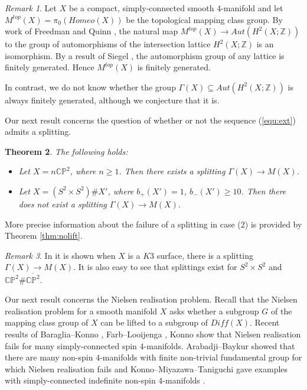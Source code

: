 \documentclass{amsart}
\newtheorem{theorem}{Theorem}[section]
\theoremstyle{definition}
\theoremstyle{remark}
\newtheorem{remark}[theorem]{Remark}
\numberwithin{equation}{section}
\begin{document}
\begin{remark}
Let $X$ be a compact, simply-connected smooth $4$-manifold and let $M^{top}(X) = \pi_0( Homeo(X) )$ be the topological mapping class group. By work of Freedman \cite{fre} and Quinn \cite{qui}, the natural map $M^{top}(X) \to Aut( H^2(X ; \mathbb{Z}))$ to the group of automorphisms of the intersection lattice $H^2(X ; \mathbb{Z})$ is an isomorphism. By a result of Siegel \cite{sie}, the automorphism group of any lattice is finitely generated. Hence $M^{top}(X)$ is finitely generated.

In contrast, we do not know whether the group $\Gamma(X) \subseteq Aut(H^2(X ; \mathbb{Z}))$ is always finitely generated, although we conjecture that it is.
\end{remark}

Our next result concerns the question of whether or not the sequence (\ref{equ:ext}) admits a splitting.

\begin{theorem}\label{thm:sns}
The following holds:
\begin{itemize}
\item[(1)]{Let $X = n \mathbb{CP}^2$, where $n \ge 1$. Then there exists a splitting $\Gamma(X) \to M(X)$.}
\item[(2)]{Let $X = (S^2 \times S^2) \# X'$, where $b_+(X') = 1$, $b_-(X') \ge 10$. Then there does not exist a splitting $\Gamma(X) \to M(X)$.}
\end{itemize}
\end{theorem}

More precise information about the failure of a splitting in case (2) is provided by Theorem \ref{thm:nolift}.

\begin{remark}
In \cite{bk3} it is shown when $X$ is a $K3$ surface, there is a splitting $\Gamma(X) \to M(X)$. It is also easy to see that splittings exist for $S^2 \times S^2$ and $\mathbb{CP}^2 \# \overline{\mathbb{CP}^2}$.
\end{remark}

Our next result concerns the Nielsen realisation problem. Recall that the Nielsen realisation problem for a smooth manifold $X$ asks whether a subgroup $G$ of the mapping class group of $X$ can be lifted to a subgroup of $Diff(X)$. Recent results of Baraglia--Konno \cite{bk3}, Farb--Looijenga \cite{fl}, Konno \cite{kon0} show that Nielsen realisation fails for many simply-connected spin $4$-manifolds. Arabadji--Baykur showed that there are many non-spin $4$-manifolds with finite non-trivial fundamental group for which Nielsen realisation fails \cite{ab} and Konno--Miyazawa--Taniguchi gave examples with simply-connected indefinite non-spin $4$-manifolds \cite{kmt0}.
\end{document}
